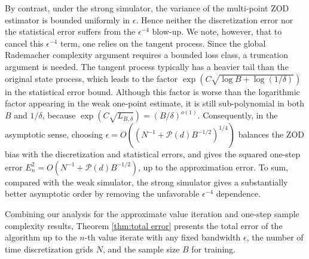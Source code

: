 \documentclass[twoside,11pt]{article}
\newcommand{\1}{\mathbf{1}}
\numberwithin{equation}{section}
\begin{document}
By contrast, under the strong simulator, the variance of the multi-point ZOD estimator is bounded uniformly in $\epsilon$. Hence neither the discretization error nor the statistical error suffers from the $\epsilon^{-4}$ blow-up. We note, however, that to cancel this $ \epsilon^{-4}$ term, one relies on the tangent process. Since the global Rademacher complexity argument requires a bounded loss class, a truncation argument is needed. The tangent process typically has a heavier tail than the original state process, which leads to the factor $\exp(C\sqrt{\log B+\log(1/\delta)})$ in the statistical error bound. Although this factor is worse than the logarithmic factor appearing in the weak one-point estimate, it is still sub-polynomial in both $B$ and $1/\delta$, because $\exp(C\sqrt{L_{B,\delta}})=(B/\delta)^{o(1)}$.  Consequently, in the asymptotic sense,  choosing $\epsilon=O((N^{-1}+\mathcal P(d)B^{-1/2})^{1/4})$ balances the ZOD bias with the discretization and statistical errors, and gives the squared one-step error $E_n^2=O(N^{-1}+\mathcal P(d)B^{-1/2})$, up to the approximation error. To sum, compared with the weak simulator, the strong simulator gives a substantially better asymptotic order by removing the unfavorable $\epsilon^{-4}$ dependence.


Combining our analysis for the approximate value iteration and one-step sample complexity results, Theorem \ref{thm:total error} presents the total error of the algorithm up to the $n$-th value iterate with any fixed bandwidth $\epsilon$, the number of time discretization grids $N$, and the sample size $B$ for training.
\end{document}
